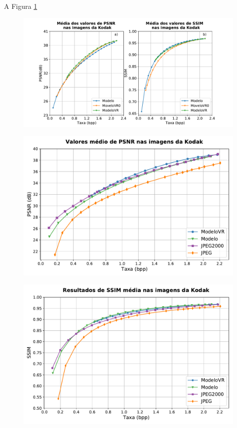 A Figura \ref{fig:comp_vr}

\begin{figure}
	\centering
	\includegraphics[width=1.0\textwidth]{figuras/com_vr.pdf}
	\caption{}  	
	\label{fig:comp_vr}
\end{figure}

\begin{figure}
	\centering
	\includegraphics[width=1.0\textwidth]{figuras/comp_codecs.pdf}
	\caption{}  	
	\label{fig:comp_codecs}
\end{figure}

\begin{figure}
	\centering
	\includegraphics[width=1.0\textwidth]{figuras/comp_codecs_ssim.pdf}
	\caption{}  	
	\label{fig:comp_codecs_ssim}
\end{figure}

